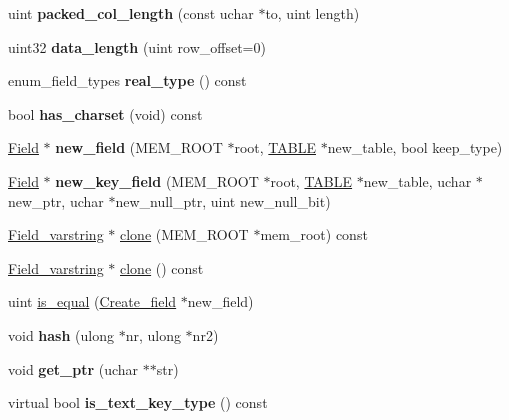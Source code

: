 \begin{DoxyCompactItemize}
\item 
\mbox{\label{classField__varstring_a3bc9f2b50cc75096036c459de232675d}} 
uint {\bfseries packed\+\_\+col\+\_\+length} (const uchar $\ast$to, uint length)
\item 
\mbox{\label{classField__varstring_a56790f56271ed4a288642cbadcb1de29}} 
uint32 {\bfseries data\+\_\+length} (uint row\+\_\+offset=0)
\item 
\mbox{\label{classField__varstring_a9a6c98270a87df4dc29d2341119264d2}} 
enum\+\_\+field\+\_\+types {\bfseries real\+\_\+type} () const
\item 
\mbox{\label{classField__varstring_aec7d8d1ecd5d2ab378775679c45d9a1d}} 
bool {\bfseries has\+\_\+charset} (void) const
\item 
\mbox{\label{classField__varstring_a8accbc1c99eaf06a8c07be34cf25c9f7}} 
\mbox{\hyperlink{classField}{Field}} $\ast$ {\bfseries new\+\_\+field} (M\+E\+M\+\_\+\+R\+O\+OT $\ast$root, \mbox{\hyperlink{structTABLE}{T\+A\+B\+LE}} $\ast$new\+\_\+table, bool keep\+\_\+type)
\item 
\mbox{\label{classField__varstring_ac6a9af2385e69f7fd159c9ef23389be4}} 
\mbox{\hyperlink{classField}{Field}} $\ast$ {\bfseries new\+\_\+key\+\_\+field} (M\+E\+M\+\_\+\+R\+O\+OT $\ast$root, \mbox{\hyperlink{structTABLE}{T\+A\+B\+LE}} $\ast$new\+\_\+table, uchar $\ast$new\+\_\+ptr, uchar $\ast$new\+\_\+null\+\_\+ptr, uint new\+\_\+null\+\_\+bit)
\item 
\mbox{\hyperlink{classField__varstring}{Field\+\_\+varstring}} $\ast$ \mbox{\hyperlink{classField__varstring_a173eea084a6a181604892d97a2e7fee1}{clone}} (M\+E\+M\+\_\+\+R\+O\+OT $\ast$mem\+\_\+root) const
\item 
\mbox{\hyperlink{classField__varstring}{Field\+\_\+varstring}} $\ast$ \mbox{\hyperlink{classField__varstring_a38f3638e349096c5471c9ec582c7c73b}{clone}} () const
\item 
uint \mbox{\hyperlink{classField__varstring_aa0bfc217f9c90b2cc741cdec8b97dd5c}{is\+\_\+equal}} (\mbox{\hyperlink{classCreate__field}{Create\+\_\+field}} $\ast$new\+\_\+field)
\item 
\mbox{\label{classField__varstring_a6288c7a3e84583c7f9dac92f7d9c421e}} 
void {\bfseries hash} (ulong $\ast$nr, ulong $\ast$nr2)
\item 
\mbox{\label{classField__varstring_a0c39d876f44a96f7a49be64fddf6b7dd}} 
void {\bfseries get\+\_\+ptr} (uchar $\ast$$\ast$str)
\item 
\mbox{\label{classField__varstring_a6b00c2b6e712590c8dbe4a9f623f3580}} 
virtual bool {\bfseries is\+\_\+text\+\_\+key\+\_\+type} () const
\end{DoxyCompactItemize}
